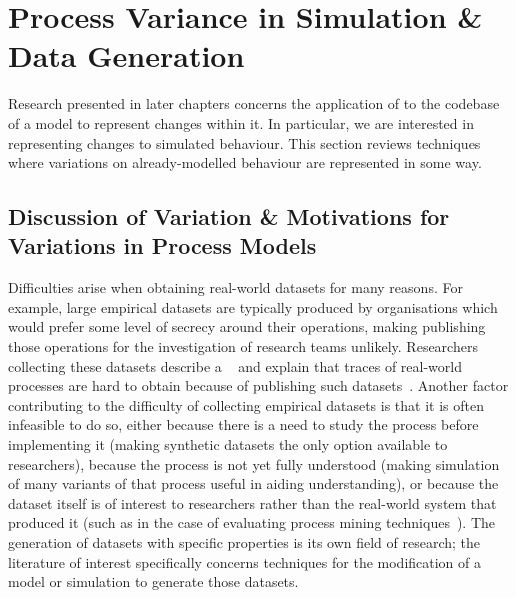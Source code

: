 \section{Process Variance in Simulation \& Data Generation}
\label{sec:dynamism_in_sm}
\label{subsec:variations_in_sm}


Research presented in later chapters concerns the application of \aop{} to the
codebase of a model to represent changes within it. In particular, we are
interested in representing changes to simulated behaviour. This section reviews
techniques where variations on already-modelled behaviour are represented in
some way.

\subsection{Discussion of Variation \& Motivations for Variations in Process Models}
\label{subsec:variation_sm_motivations}

Difficulties arise when obtaining real-world datasets for many reasons. For
example, large empirical datasets are typically produced by organisations which
would prefer some level of secrecy around their operations, making publishing
those operations for the investigation of research teams unlikely. Researchers
collecting these datasets describe a ~\cite{bpi_ten_years_of_datasets} and explain that traces of real-world
processes are hard to obtain because  of publishing such
datasets~\cite{bpi_ten_years_of_datasets}. Another factor contributing to the
difficulty of collecting empirical datasets is that it is often infeasible to do
so, either because there is a need to study the process before implementing it
(making synthetic datasets the only option available to researchers), because
the process is not yet fully understood (making simulation of many variants of
that process useful in aiding understanding), or because the dataset itself is
of interest to researchers rather than the real-world system that produced it
(such as in the case of evaluating process mining
techniques~\cite{van2004process,agrawal1998mining}). The
generation of datasets with specific properties is its own field of research;
the literature of interest specifically concerns techniques for the modification
of a model or simulation to generate those datasets.

